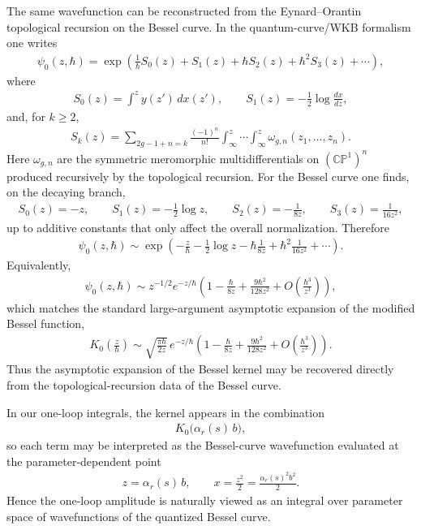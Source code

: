 The same wavefunction can be reconstructed from the Eynard--Orantin topological recursion on the Bessel curve. In the quantum-curve/WKB formalism one writes
\begin{align}
    \psi_0(z,\hbar)
    =
    \exp\!\left(
        \frac{1}{\hbar}S_0(z)+S_1(z)+\hbar S_2(z)+\hbar^2 S_3(z)+\cdots
    \right),
\end{align}
where
\begin{align}
    S_0(z)=\int^z y(z')\,dx(z'),
    \qquad
    S_1(z)=-\frac{1}{2}\log\frac{dx}{dz},
\end{align}
and, for \(k\ge 2\),
\begin{align}
    S_k(z)
    =
    \sum_{2g-1+n=k}
    \frac{(-1)^n}{n!}
    \int_{\infty}^{z}\cdots\int_{\infty}^{z}
    \omega_{g,n}(z_1,\ldots,z_n).
\end{align}
Here \(\omega_{g,n}\) are the symmetric meromorphic multidifferentials on \((\mathbb{CP}^1)^n\) produced recursively by the topological recursion. For the Bessel curve one finds, on the decaying branch,
\begin{align}
    S_0(z)=-z,
    \qquad
    S_1(z)=-\frac{1}{2}\log z,
    \qquad
    S_2(z)=-\frac{1}{8z},
    \qquad
    S_3(z)=\frac{1}{16z^2},
\end{align}
up to additive constants that only affect the overall normalization. Therefore
\begin{align}
    \psi_0(z,\hbar)
    \sim
    \exp\!\left(
        -\frac{z}{\hbar}
        -\frac{1}{2}\log z
        -\hbar\frac{1}{8z}
        +\hbar^2\frac{1}{16z^2}
        +\cdots
    \right).
\end{align}
Equivalently,
\begin{align}
    \psi_0(z,\hbar)
    \sim
    z^{-1/2}e^{-z/\hbar}
    \left(
        1-\frac{\hbar}{8z}
        +\frac{9\hbar^2}{128z^2}
        +O\!\left(\frac{\hbar^3}{z^3}\right)
    \right),
\end{align}
which matches the standard large-argument asymptotic expansion of the modified Bessel function,
\begin{align}
    K_0\!\left(\frac{z}{\hbar}\right)
    \sim
    \sqrt{\frac{\pi\hbar}{2z}}\,
    e^{-z/\hbar}
    \left(
        1-\frac{\hbar}{8z}
        +\frac{9\hbar^2}{128z^2}
        +O\!\left(\frac{\hbar^3}{z^3}\right)
    \right).
\end{align}
Thus the asymptotic expansion of the Bessel kernel may be recovered directly from the topological-recursion data of the Bessel curve.

In our one-loop integrals, the kernel appears in the combination
\begin{align}
    K_0\!\big(\alpha_r(s)\,b\big),
\end{align}
so each term may be interpreted as the Bessel-curve wavefunction evaluated at the parameter-dependent point
\begin{align}
    z=\alpha_r(s)\,b,
    \qquad
    x=\frac{z^2}{2}=\frac{\alpha_r(s)^2b^2}{2}.
\end{align}
Hence the one-loop amplitude is naturally viewed as an integral over parameter space of wavefunctions of the quantized Bessel curve.

